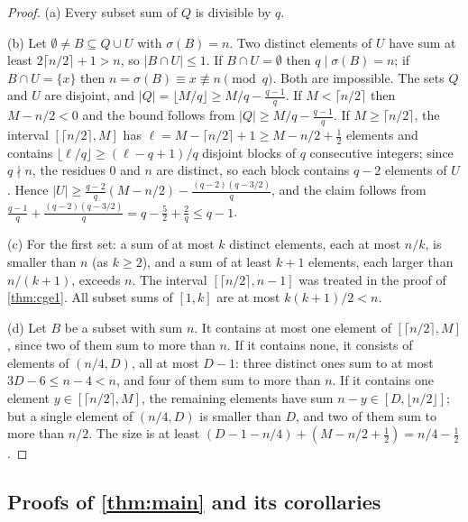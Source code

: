 \documentclass[11pt,reqno]{amsart}
\numberwithin{equation}{section}
\theoremstyle{definition}
\theoremstyle{remark}
\newcommand{\card}[1]{\lvert #1\rvert}
\newcommand{\floor}[1]{\lfloor #1\rfloor}
\newcommand{\ceil}[1]{\lceil #1\rceil}
\begin{document}
\begin{proof}
(a) Every subset sum of $Q$ is divisible by $q$.

(b) Let $\emptyset\ne B\subseteq Q\cup U$ with $\sigma(B)=n$. Two distinct elements of $U$ have sum at least $2\ceil{n/2}+1>n$, so $\card{B\cap U}\le1$. If $B\cap U=\emptyset$ then $q\mid\sigma(B)=n$; if $B\cap U=\{x\}$ then $n=\sigma(B)\equiv x\not\equiv n\pmod q$. Both are impossible. The sets $Q$ and $U$ are disjoint, and $\card Q=\floor{M/q}\ge M/q-\frac{q-1}q$. If $M<\ceil{n/2}$ then $M-n/2<0$ and the bound follows from $\card Q\ge M/q-\frac{q-1}{q}$. If $M\ge\ceil{n/2}$, the interval $[\ceil{n/2},M]$ has $\ell=M-\ceil{n/2}+1\ge M-n/2+\frac12$ elements and contains $\floor{\ell/q}\ge(\ell-q+1)/q$ disjoint blocks of $q$ consecutive integers; since $q\nmid n$, the residues $0$ and $n$ are distinct, so each block contains $q-2$ elements of $U$. Hence $\card U\ge\frac{q-2}q(M-n/2)-\frac{(q-2)(q-3/2)}q$, and the claim follows from $\frac{q-1}q+\frac{(q-2)(q-3/2)}q=q-\frac52+\frac2q\le q-1$.

(c) For the first set: a sum of at most $k$ distinct elements, each at most $n/k$, is smaller than $n$ (as $k\ge2$), and a sum of at least $k+1$ elements, each larger than $n/(k+1)$, exceeds $n$. The interval $[\ceil{n/2},n-1]$ was treated in the proof of \cref{thm:cge1}. All subset sums of $[1,k]$ are at most $k(k+1)/2<n$.

(d) Let $B$ be a subset with sum $n$. It contains at most one element of $[\ceil{n/2},M]$, since two of them sum to more than $n$. If it contains none, it consists of elements of $(n/4,D)$, all at most $D-1$: three distinct ones sum to at most $3D-6\le n-4<n$, and four of them sum to more than $n$. If it contains one element $y\in[\ceil{n/2},M]$, the remaining elements have sum $n-y\in[D,\floor{n/2}]$; but a single element of $(n/4,D)$ is smaller than $D$, and two of them sum to more than $n/2$. The size is at least $(D-1-n/4)+(M-n/2+\frac12)=n/4-\frac12$.
\end{proof}

\subsection{Proofs of \texorpdfstring{\cref{thm:main}}{Theorem 1.4} and its corollaries}
\end{document}
